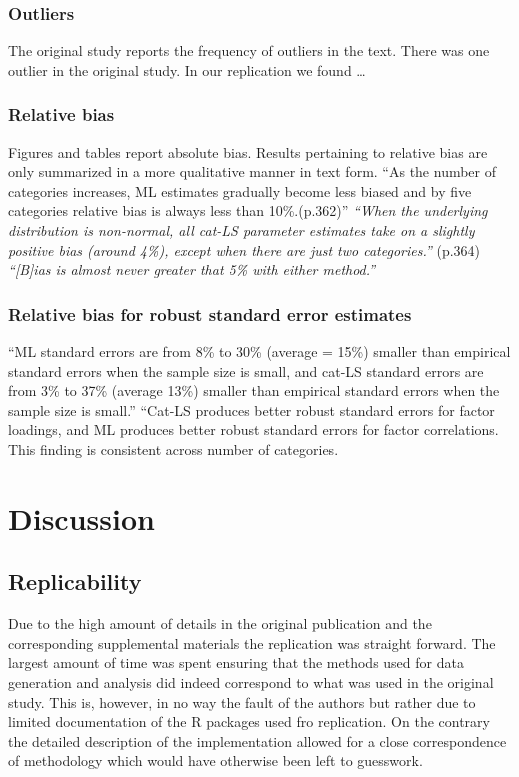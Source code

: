 \documentclass[10,a4paperpaper,]{article}
\begin{document}
\subsubsection{Outliers}

The original study reports the frequency of outliers in the text. There
was one outlier in the original study. In our replication we found
\ldots{}

\subsubsection{Relative bias}

Figures and tables report absolute bias. Results pertaining to relative
bias are only summarized in a more qualitative manner in text form. ``As
the number of categories increases, ML estimates gradually become less
biased and by five categories relative bias is always less than
10\%.(p.362)'' \emph{``When the underlying distribution is non-normal,
all cat-LS parameter estimates take on a slightly positive bias (around
4\%), except when there are just two categories.''} (p.364)
\emph{``{[}B{]}ias is almost never greater that 5\% with either
method.''}

\subsubsection{Relative bias for robust standard error estimates}

``ML standard errors are from 8\% to 30\% (average = 15\%) smaller than
empirical standard errors when the sample size is small, and cat-LS
standard errors are from 3\% to 37\% (average 13\%) smaller than
empirical standard errors when the sample size is small.'' ``Cat-LS
produces better robust standard errors for factor loadings, and ML
produces better robust standard errors for factor correlations. This
finding is consistent across number of categories.

\FloatBarrier
\section{Discussion}

\subsection{Replicability}

Due to the high amount of details in the original publication and the
corresponding supplemental materials the replication was straight
forward. The largest amount of time was spent ensuring that the methods
used for data generation and analysis did indeed correspond to what was
used in the original study. This is, however, in no way the fault of the
authors but rather due to limited documentation of the R packages used
fro replication. On the contrary the detailed description of the
implementation allowed for a close correspondence of methodology which
would have otherwise been left to guesswork.
\end{document}
